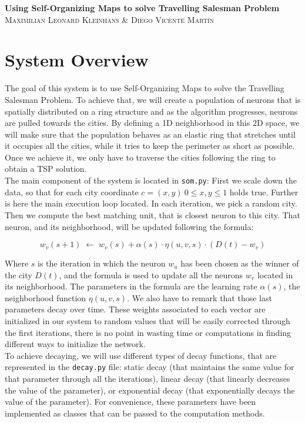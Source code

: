 \documentclass[11pt]{article}
\begin{document}
\begin{center}
  \Huge\textbf{Using Self-Organizing Maps to solve Travelling Salesman
    Problem}\\
  \vspace{1cm}
  \large\textsc{Maximilian Leonard Kleinhans \& Diego Vicente Martín}
\end{center}

\section{System Overview}

The goal of this system is to use Self-Organizing Maps to solve the Travelling
Salesman Problem. To achieve that, we will create a population of neurons that
is spatially distributed on a ring structure and as the algorithm progresses,
neurons are pulled towards the cities. By defining a 1D neighborhood in this 2D
space, we will make sure that the population behaves as an elastic ring that
stretches until it occupies all the cities, while it tries to keep the perimeter
as short as possible. Once we achieve it, we only have to traverse the cities
following the ring to obtain a TSP solution.\\

The main component of the system is located in \texttt{som.py}: First we scale
down the data, so that for each city coordinate $ c= (x, y) ~ 0 \le x,y \le 1$
holds true. Further is here the main execution loop located. In each iteration,
we pick a random city. Then we compute the best matching unit, that is closest
neuron to this city. That neuron, and its neighborhood, will be updated
following the formula:

$$
w_v(s+1) \; \leftarrow \;
w_v(s) + \alpha (s) \cdot \eta (u, v, s) \cdot (D(t) - w_v)
$$

Where $s$ is the iteration in which the neuron $w_u$ has been chosen as the
winner of the city $D(t)$, and the formula is used to update all the neurons
$w_v$ located in its neighborhood. The parameters in the formula are the
learning rate $\alpha(s)$,  the neighborhood function  $\eta(u, v, s)$. We also
have to remark that those last parameters decay over time. These weights
associated to each vector are initialized in our system to random values that
will be easily corrected through the first iterations, there is no point in
wasting time or computations in finding different ways to initialize the
network.\\

To achieve decaying, we will use different types of decay functions, that are
represented in the \texttt{decay.py} file: static decay (that maintains the same
value for that parameter through all the iterations), linear decay (that linearly
decreases the value of the parameter), or exponential decay (that exponentially
decays the value of the parameter). For convenience, these parameters have been
implemented as classes that can be passed to the computation methods.\\
\end{document}
